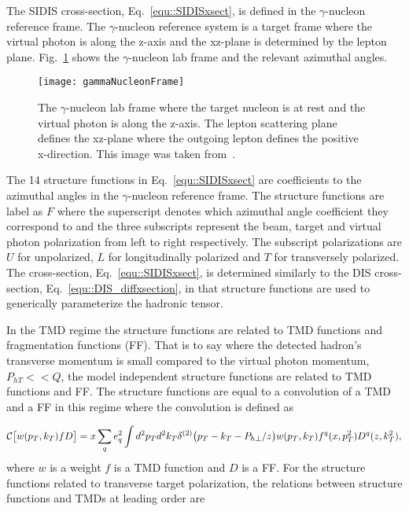 The SIDIS cross-section, Eq.~\ref{equ::SIDISxsect}, is defined in the
$\gamma$-nucleon reference frame.  The $\gamma$-nucleon reference system is a
target frame where the virtual photon is along the z-axis and the xz-plane is
determined by the lepton plane.  Fig.~\ref{fig::gammaNucleonFrame} shows the
$\gamma$-nucleon lab frame and the relevant azimuthal angles.

\begin{figure}[h!t]
  \centering \texttt{[image: gammaNucleonFrame]}
  \caption{The $\gamma$-nucleon lab frame where the target nucleon is at rest
    and the virtual photon is along the z-axis.  The lepton scattering plane
    defines the xz-plane where the outgoing lepton defines the positive
    x-direction.  This image was taken from~\cite{Bacchetta:2006tn}.}
  \label{fig::gammaNucleonFrame}
\end{figure}

The 14 structure functions in Eq.~\ref{equ::SIDISxsect} are coefficients to the
azimuthal angles in the $\gamma$-nucleon reference frame.  The structure
functions are label as $F$ where the superscript denotes which azimuthal angle
coefficient they correspond to and the three subscripts represent the beam,
target and virtual photon polarization from left to right respectively.  The
subscript polarizations are $U$ for unpolarized, $L$ for longitudinally
polarized and $T$ for transversely polarized.  The cross-section,
Eq.~\ref{equ::SIDISxsect}, is determined similarly to the DIS
cross-section, Eq.~\ref{equ::DIS_diffxsection}, in that structure functions are
used to generically parameterize the hadronic tensor.

In the TMD regime the structure functions are related to TMD functions and
fragmentation functions (FF).  That is to say where the detected hadron's
transverse momentum is small compared to the virtual photon momentum, $P_{hT} <<
Q$, the model independent structure functions are related to TMD functions and
FF.  The structure functions are equal to a convolution of a TMD and a FF in
this regime where the convolution is defined as

\begin{equation}
  \label{equ::SIDIS_conv}
{\cal C}\bigl[ w(p_T,k_T) f D \bigr] = x \sum_q e_q^2 \int d^2 p_T d^2 k_T
\delta^{(2)}\bigl(p_T - k_T - P_{h \perp}/z \bigr) w(p_T,k_T)
f^q(x,p_T^2)D^q(z,k_T^2),
\end{equation}
\noindent
where $w$ is a weight $f$ is a TMD function and $D$ is a FF.  For the structure
functions related to transverse target polarization, the relations between
structure functions and TMDs at leading order are~\cite{Bacchetta:2006tn}

